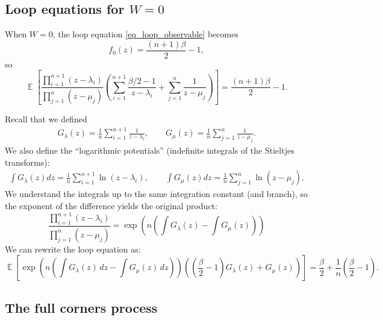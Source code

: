 \documentclass[letterpaper,11pt,oneside,reqno]{article}
\numberwithin{equation}{section}
\theoremstyle{definition}
\begin{document}
\subsection{Loop equations for $W=0$}

When $W=0$, the loop equation \eqref{eq_loop_observable} becomes
\begin{equation*}
	f_0(z)=\frac{(n+1)\beta}{2}-1,
\end{equation*}
so 
\begin{equation*}
		\operatorname{\mathbb{E}}\left[\frac{\prod_{i=1}^{n+1}(z-\lambda_i)}{\prod_{j=1}^n(z-\mu_j)}\left(\sum_{i=1}^{n+1}\frac{\beta/2-1}{z-\lambda_i} + \sum_{j=1}^n\frac{1}{z-\mu_j}\right)\right] = \frac{(n+1)\beta}{2}-1.
\end{equation*}

Recall that we defined
\begin{align*}
G_\lambda(z) = \frac{1}{n}\sum_{i=1}^{n+1}\frac{1}{z-\lambda_i}, 
\qquad 
G_\mu(z) = \frac{1}{n}\sum_{j=1}^n\frac{1}{z-\mu_j}.
\end{align*}
We also define the ``logarithmic potentials'' (indefinite integrals of the Stieltjes transforms):
\begin{align*}
\int G_\lambda(z)dz = \frac{1}{n}\sum_{i=1}^{n+1}\ln(z-\lambda_i), \qquad
\int G_\mu(z)dz = \frac{1}{n}\sum_{j=1}^n\ln(z-\mu_j).
\end{align*}
We understand the integrals up to the same integration constant (and branch), so the exponent of the difference
yields the original product:
\begin{equation*}
	\frac{\prod_{i=1}^{n+1}(z-\lambda_i)}{\prod_{j=1}^n(z-\mu_j)} = \exp\left(n\left(\int G_\lambda(z) - \int G_\mu(z)\right)\right)
\end{equation*}
We can rewrite 
the loop equation
as:
\begin{equation} \label{eq:stieltjes_transform_eq}
	\operatorname{\mathbb{E}}\left[\exp\left(n\left(\int G_\lambda(z)\,dz - \int G_\mu(z)\,dz\right)\right)\left(\left(\frac{\beta}{2}-1\right)G_\lambda(z) + G_\mu(z)\right)\right] = \frac{\beta}{2} + \frac{1}{n}\left(\frac{\beta}{2}-1\right).
\end{equation}

\subsection{The full corners process}
\end{document}

